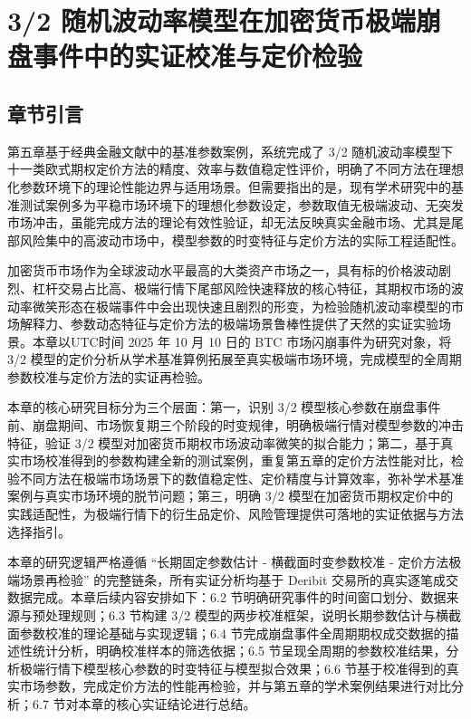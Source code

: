 \chapter{3/2 随机波动率模型在加密货币极端崩盘事件中的实证校准与定价检验}

\section{章节引言}

第五章基于经典金融文献中的基准参数案例，系统完成了 3/2 随机波动率模型下十一类欧式期权定价方法的精度、效率与数值稳定性评价，明确了不同方法在理想化参数环境下的理论性能边界与适用场景。但需要指出的是，现有学术研究中的基准测试案例多为平稳市场环境下的理想化参数设定，参数取值无极端波动、无突发市场冲击，虽能完成方法的理论有效性验证，却无法反映真实金融市场、尤其是尾部风险集中的高波动市场中，模型参数的时变特征与定价方法的实际工程适配性。

加密货币市场作为全球波动水平最高的大类资产市场之一，具有标的价格波动剧烈、杠杆交易占比高、极端行情下尾部风险快速释放的核心特征，其期权市场的波动率微笑形态在极端事件中会出现快速且剧烈的形变，为检验随机波动率模型的市场解释力、参数动态特征与定价方法的极端场景鲁棒性提供了天然的实证实验场景。本章以UTC时间 2025 年 10 月 10 日的 BTC 市场闪崩事件为研究对象，将 3/2 模型的定价分析从学术基准算例拓展至真实极端市场环境，完成模型的全周期参数校准与定价方法的实证再检验。

本章的核心研究目标分为三个层面：第一，识别 3/2 模型核心参数在崩盘事件前、崩盘期间、市场恢复期三个阶段的时变规律，明确极端行情对模型参数的冲击特征，验证 3/2 模型对加密货币期权市场波动率微笑的拟合能力；第二，基于真实市场校准得到的参数构建全新的测试案例，重复第五章的定价方法性能对比，检验不同方法在极端市场场景下的数值稳定性、定价精度与计算效率，弥补学术基准案例与真实市场环境的脱节问题；第三，明确 3/2 模型在加密货币期权定价中的实践适配性，为极端行情下的衍生品定价、风险管理提供可落地的实证依据与方法选择指引。

本章的研究逻辑严格遵循 “长期固定参数估计 - 横截面时变参数校准 - 定价方法极端场景再检验” 的完整链条，所有实证分析均基于 Deribit 交易所的真实逐笔成交数据完成。本章后续内容安排如下：6.2 节明确研究事件的时间窗口划分、数据来源与预处理规则；6.3 节构建 3/2 模型的两步校准框架，说明长期参数估计与横截面参数校准的理论基础与实现逻辑；6.4 节完成崩盘事件全周期期权成交数据的描述性统计分析，明确校准样本的筛选依据；6.5 节呈现全周期的参数校准结果，分析极端行情下模型核心参数的时变特征与模型拟合效果；6.6 节基于校准得到的真实市场参数，完成定价方法的性能再检验，并与第五章的学术案例结果进行对比分析；6.7 节对本章的核心实证结论进行总结。

